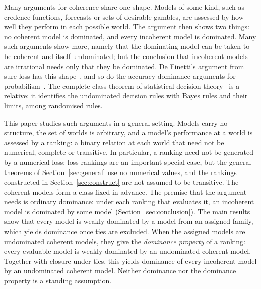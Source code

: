 \documentclass[11pt]{article}
\theoremstyle{definition}
\theoremstyle{remark}
\begin{document}
Many arguments for coherence share one shape. Models of some kind, such as credence functions, forecasts or sets of desirable gambles, are assessed by how well they perform in each possible world. The argument then shows two things: no coherent model is dominated, and every incoherent model is dominated. Many such arguments show more, namely that the dominating model can be taken to be coherent and itself undominated; but the conclusion that incoherent models are irrational needs only that they be dominated. De Finetti's argument from sure loss has this shape~\cite{deFinetti}, and so do the accuracy-dominance arguments for probabilism~\cite{Joyce,Predd,SSK09,Pettigrew,Nielsen}. The complete class theorem of statistical decision theory~\cite{Wald} is a relative: it identifies the undominated decision rules with Bayes rules and their limits, among randomised rules.

This paper studies such arguments in a general setting. Models carry no structure, the set of worlds is arbitrary, and a model's performance at a world is assessed by a ranking: a binary relation at each world that need not be numerical, complete or transitive. In particular, a ranking need not be generated by a numerical loss: loss rankings are an important special case, but the general theorems of Section~\ref{sec:general} use no numerical values, and the rankings constructed in Section~\ref{sec:construct} are not assumed to be transitive. The coherent models form a class fixed in advance. The premise that the argument needs is ordinary dominance: under each ranking that evaluates it, an incoherent model is dominated by some model (Section~\ref{sec:conclusion}). The main results show that every model is weakly dominated by a model from an assigned family, which yields dominance once ties are excluded. When the assigned models are undominated coherent models, they give the \emph{dominance property} of a ranking: every evaluable model is weakly dominated by an undominated coherent model. Together with closure under ties, this yields dominance of every incoherent model by an undominated coherent model. Neither dominance nor the dominance property is a standing assumption.
\end{document}
